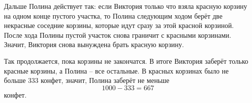 Дальше Полина действует так: если Виктория только что взяла красную корзину на одном конце пустого участка, то Полина следующим ходом берёт две некрасные соседние корзины, которые идут сразу за этой красной корзиной. После хода Полины пустой участок снова граничит с красными корзинами. Значит, Виктория снова вынуждена брать красную корзину.

Так продолжается, пока корзины не закончатся. В итоге Виктория заберёт только красные корзины, а Полина -- все остальные. В красных корзинах было не больше $333$ конфет, значит, Полина заберёт не меньше
\[
1000-333=667
\]
конфет.